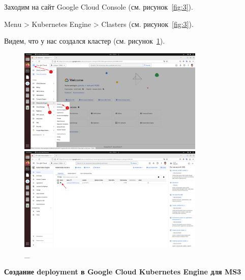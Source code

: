 \documentclass[12pt, a4paper, simple]{eskdtext}
\begin{document}
  Заходим на сайт Google Cloud Console \cite{GoogleCloudConsole} (см. рисунок~\ref{fig:3}).

  Menu > Kubernetes Engine > Clasters (см. рисунок~\ref{fig:3}).

  Видем, что у нас создался кластер (см. рисунок~\ref{fig:4}).

  \begin{figure}[!h]
    \centering

    \begin{minipage}{0.49\textwidth}
      \centering

      \includegraphics[height=5cm]
      {images/2023-03-03_00-54-36.png}

      \caption{\_}

      \label{fig:3}
    \end{minipage}
    \begin{minipage}{0.49\textwidth}
      \centering

      \includegraphics[height=5cm]
      {images/2023-03-03_00-54-54.png}

      \caption{\_}

      \label{fig:4}
    \end{minipage}
  \end{figure}

  \newpage

  \begin{center}
    \textbf{Создание deployment в Google Cloud Kubernetes Engine для MS3}
  \end{center}
\end{document}
